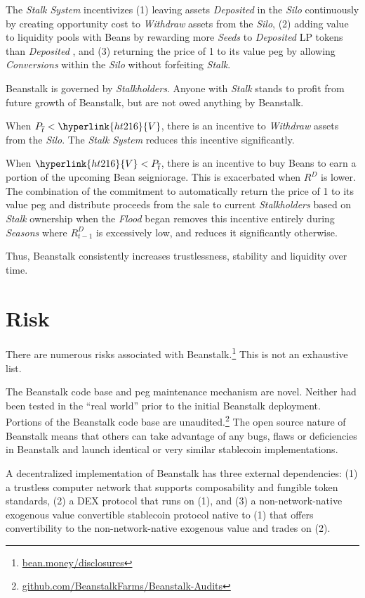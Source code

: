 \documentclass[tikz]{article}
\newcommand{\term}[1]{\textsl{#1}}
\newcommand{\fref}[1]{\footnote{\href{http://#1}{#1}}}
\newcommand{\Bean}{} %
\begin{document}
The \term{Stalk System} incentivizes (1) leaving assets \term{Deposited} in the \term{Silo} continuously by creating opportunity cost to \term{Withdraw} assets from the \term{Silo}, (2) adding value to liquidity pools with Beans by rewarding more \term{Seeds} to \term{Deposited} LP tokens than \term{Deposited} \Bean, and (3) returning the price of \Bean1 to its value peg by allowing \term{Conversions} within the \term{Silo} without forfeiting \term{Stalk}.

Beanstalk is governed by \term{Stalkholders}. Anyone with \term{Stalk} stands to profit from future growth of Beanstalk, but are not owed anything by Beanstalk. 

When $P_{\overline{t}} < \hyperlink{ht216}{V}$, there is an incentive to \term{Withdraw} assets from the \term{Silo}. The \term{Stalk System} reduces this incentive significantly.

When $\hyperlink{ht216}{V} < P_{\overline{t}}$, there is an incentive to buy Beans to earn a portion of the upcoming Bean seigniorage. This is exacerbated when \hyperlink{ht156}{$R^D$} is lower. The combination of the commitment to automatically return the price of \Bean1 to its value peg and distribute proceeds from the sale to current \term{Stalkholders} based on \term{Stalk} ownership when the \term{Flood} began removes this incentive entirely during \term{Seasons} where \hyperlink{ht157}{$R^D_{t-1}$} is excessively low, and reduces it significantly otherwise.

Thus, Beanstalk consistently increases trustlessness, stability and liquidity over time.

\section{Risk}
There are numerous risks associated with Beanstalk.\fref{bean.money/disclosures} This is not an exhaustive list.

The Beanstalk code base and peg maintenance mechanism are novel. Neither had been tested in the “real world” prior to the initial Beanstalk deployment. Portions of the Beanstalk code base are unaudited.\footnote{\href{https://github.com/BeanstalkFarms/Beanstalk-Audits}{github.com/BeanstalkFarms/Beanstalk-Audits}} The open source nature of Beanstalk means that others can take advantage of any bugs, flaws or deficiencies in Beanstalk and launch identical or very similar stablecoin implementations.

A decentralized implementation of Beanstalk has three external dependencies: (1) a trustless computer network that supports composability and fungible token standards, (2) a DEX protocol that runs on (1), and (3) a non-network-native exogenous value convertible stablecoin protocol native to (1) that offers convertibility to the non-network-native exogenous value and trades on (2). 
\end{document}
